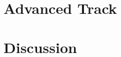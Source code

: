 \documentclass[11pt]{article}
\begin{document}
%

\section{Advanced Track}

%
%

\section{Discussion}

\end{document}
